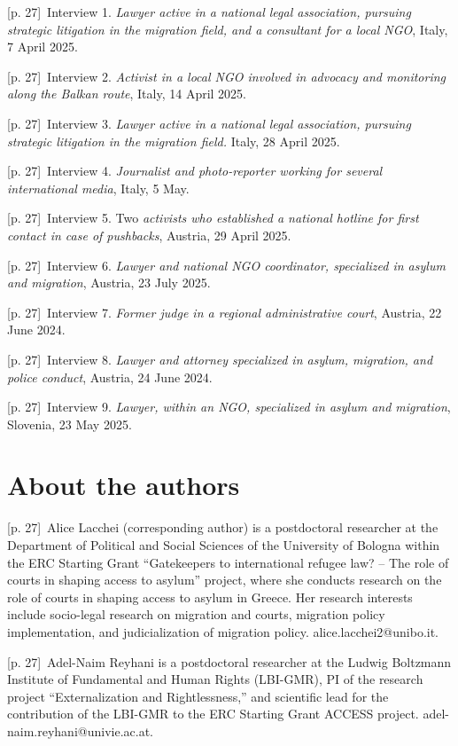 \documentclass[10pt,a4paper]{article}
\begin{document}
{\scriptsize\color{gray} [p. 27]}\ Interview 1. \textit{Lawyer active in a national legal association, pursuing strategic litigation in the migration field, and a consultant for a local NGO}, Italy, 7 April 2025.\par
{\scriptsize\color{gray} [p. 27]}\ Interview 2. \textit{Activist in a local NGO involved in advocacy and monitoring along the Balkan route}, Italy, 14 April 2025.\par
{\scriptsize\color{gray} [p. 27]}\ Interview 3. \textit{Lawyer active in a national legal association, pursuing strategic litigation in the migration field.} Italy, 28 April 2025.\par
{\scriptsize\color{gray} [p. 27]}\ Interview 4. \textit{Journalist and photo-reporter working for several international media}, Italy, 5 May.\par
{\scriptsize\color{gray} [p. 27]}\ Interview 5. Two \textit{activists who established a national hotline for first contact in case of pushbacks}, Austria, 29 April 2025.\par
{\scriptsize\color{gray} [p. 27]}\ Interview 6. \textit{Lawyer and national NGO coordinator, specialized in asylum and migration}, Austria, 23 July 2025.\par
{\scriptsize\color{gray} [p. 27]}\ Interview 7. \textit{Former judge in a regional administrative court}, Austria, 22 June 2024.\par
{\scriptsize\color{gray} [p. 27]}\ Interview 8. \textit{Lawyer and attorney specialized in asylum, migration, and police conduct}, Austria, 24 June 2024.\par
{\scriptsize\color{gray} [p. 27]}\ Interview 9. \textit{Lawyer, within an NGO, specialized in asylum and migration}, Slovenia, 23 May 2025.\par
{}\section*{About the authors}
{\scriptsize\color{gray} [p. 27]}\ Alice Lacchei (corresponding author) is a postdoctoral researcher at the Department of Political and Social Sciences of the University of Bologna within the ERC Starting Grant “Gatekeepers to international refugee law? – The role of courts in shaping access to asylum” project, where she conducts research on the role of courts in shaping access to asylum in Greece. Her research interests include socio-legal research on migration and courts, migration policy implementation, and judicialization of migration policy. alice.lacchei2@unibo.it.\par
{\scriptsize\color{gray} [p. 27]}\ Adel-Naim Reyhani is a postdoctoral researcher at the Ludwig Boltzmann Institute of Fundamental and Human Rights (LBI-GMR), PI of the research project “Externalization and Rightlessness,” and scientific lead for the contribution of the LBI-GMR to the ERC Starting Grant ACCESS project. adel-naim.reyhani@univie.ac.at.\par
\end{document}
